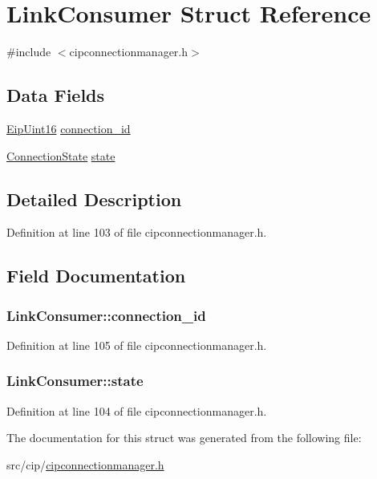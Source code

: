 \hypertarget{structLinkConsumer}{\section{\-Link\-Consumer \-Struct \-Reference}
\label{dd/dd5/structLinkConsumer}
}


{\ttfamily \#include $<$cipconnectionmanager.\-h$>$}

\subsection*{\-Data \-Fields}
\begin{DoxyCompactItemize}
\item 
\hyperlink{typedefs_8h_ac1b4cfa25b4f5def62f23b455dd395d8}{\-Eip\-Uint16} \hyperlink{structLinkConsumer_ad7f55fcf1bd50249fab8b35ac46482f1}{connection\-\_\-id}
\item 
\hyperlink{cipconnectionmanager_8h_acdd867d72142510ce53521a63a062f9b}{\-Connection\-State} \hyperlink{structLinkConsumer_af52c503fb4992d7057fc4280ff638392}{state}
\end{DoxyCompactItemize}


\subsection{\-Detailed \-Description}


\-Definition at line 103 of file cipconnectionmanager.\-h.



\subsection{\-Field \-Documentation}
\hypertarget{structLinkConsumer_ad7f55fcf1bd50249fab8b35ac46482f1}{
\subsubsection[{connection\-\_\-id}]{ {\bf \-Link\-Consumer\-::connection\-\_\-id}}}\label{dd/dd5/structLinkConsumer_ad7f55fcf1bd50249fab8b35ac46482f1}


\-Definition at line 105 of file cipconnectionmanager.\-h.

\hypertarget{structLinkConsumer_af52c503fb4992d7057fc4280ff638392}{
\subsubsection[{state}]{ {\bf \-Link\-Consumer\-::state}}}\label{dd/dd5/structLinkConsumer_af52c503fb4992d7057fc4280ff638392}


\-Definition at line 104 of file cipconnectionmanager.\-h.



\-The documentation for this struct was generated from the following file\-:\begin{DoxyCompactItemize}
\item 
src/cip/\hyperlink{cipconnectionmanager_8h}{cipconnectionmanager.\-h}\end{DoxyCompactItemize}
